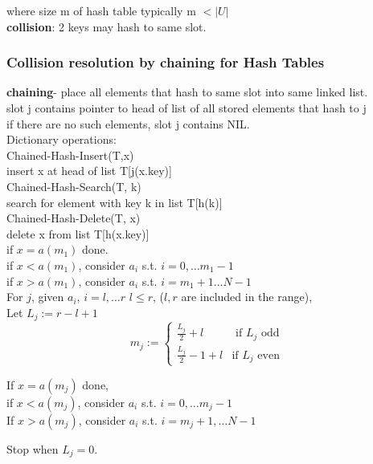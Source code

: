 \documentclass[10pt]{amsart}
\begin{document}
\begin{multicols*}{2}
where size m of hash table typically m $< |U|$ \\

\textbf{collision}: 2 keys may hash to same slot. 

\subsubsection{Collision resolution by chaining for Hash Tables}

\textbf{chaining}- place all elements that hash to same slot into same linked list. \\
slot j contains pointer to head of list of all stored elements that hash to j \\
if there are no such elements, slot j contains NIL. \\

Dictionary operations: \\
Chained-Hash-Insert(T,x) \\
\quad insert x at head of list T[j(x.key)] \\

Chained-Hash-Search(T, k) \\
\quad search for element with key k in list T[h(k)] \\

Chained-Hash-Delete(T, x) \\
\quad delete x from list T[h(x.key)] \\


if $x=a(m_1)$ done. \\
if $x< a(m_1)$, consider $a_i$ s.t. $i=0, \dots m_1-1$ \\
if $x>a(m_1)$, consider $a_i$ s.t. $i=m_1+1 \dots N-1$ \\

For $j$, given $a_i$, $i=l, \dots r$ $l\leq r$, ($l, r$ are included in the range), \\
Let $L_j := r - l +1$ \\
\[
m_j := \begin{cases} \frac{L_j}{2} + l & \text{ if $L_j$ odd } \\
\frac{L_j}{2} - 1 + l & \text{if $L_j$ even } \end{cases} 
\]

If $x=a(m_j)$ done, \\
if $x<a(m_j)$, consider $a_i$ s.t. $i=0,\dots m_j -1$ \\
If $x> a(m_j)$, consider $a_i$ s.t. $i=m_j+1, \dots N-1$ 

Stop when $L_j=0$.


\end{multicols*}
\end{document}
